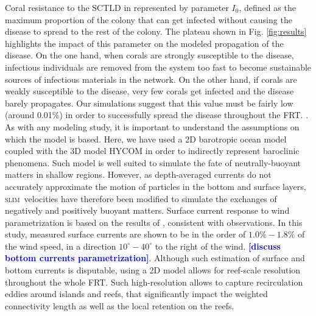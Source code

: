 \documentclass[utf8]{frontiersSCNS}
\newcommand{\slim}{\textsc{slim}\ }
\newcommand{\lew}[1]{\textbf{\textcolor{blue}{#1}}}
\newcommand{\dobby}[1]{\textbf{\color{violet}{#1}}}
\begin{document}
Coral resistance to the SCTLD in represented by parameter $I_0$, defined as the maximum proportion of the colony that can get infected without causing the disease to spread to the rest of the colony. The plateau shown in Fig. \ref{fig:results} highlights the impact of this parameter on the modeled propagation of the disease. On the one hand, when corals are strongly susceptible to the disease, infectious individuals are removed from the system too fast to become sustainable sources of infectious materials in the network. On the other hand, if corals are weakly susceptible to the disease, very few corals get infected and the disease barely propagates. Our simulations suggest that this value must be fairly low (around 0.01\%) in order to successfully spread the disease throughout the FRT. \dobby{This seems to imply that susceptible coral species have very weak defense mechanisms against the causative agent of the disease. (?)}.\\

As with any modeling study, it is important to understand the assumptions on which the model is based. Here, we have used a 2D barotropic ocean model coupled with the 3D model HYCOM \citep{Chassignet2007} in order to indirectly represent baroclinic phenomena. Such model is well suited to simulate the fate of neutrally-buoyant matters in shallow regions. However, as depth-averaged currents do not accurately approximate the motion of particles in the bottom and surface layers, \slim velocities have therefore been modified to simulate the exchanges of negatively and positively buoyant matters. Surface current response to wind parametrization is based on the results of \cite{ardhuin2009observation}, consistent with observations. In this study, measured surface currents are shown to be in the order of $1.0\% - 1.8\%$ of the wind speed, in a direction $10^\circ - 40^\circ$ to the right of the wind. \lew{[discuss bottom currents parametrization]}. Although such estimation of surface and bottom currents is disputable, using a 2D model allows for reef-scale resolution throughout the whole FRT. Such high-resolution allows to capture recirculation eddies around islands and reefs, that significantly impact the weighted connectivity length as well as the local retention on the reefs.
\end{document}
